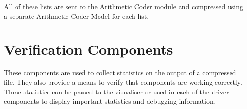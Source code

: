 \documentclass[a4paper,11pt]{report}
\begin{document}
All of these lists are sent to the Arithmetic Coder module and compressed using a separate Arithmetic Coder Model for each list. 

\section{Verification Components}
 
These components are used to collect statistics on the output of a compressed file. They also provide a means to verify that components are working correctly. These statistics can be passed to the visualiser or used in each of the driver components to display important statistics and debugging information. 


\end{document}
